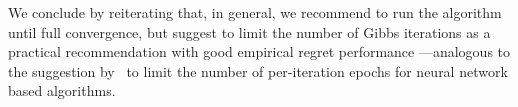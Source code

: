 We conclude by reiterating that, in general, we recommend to run the algorithm until full convergence, but suggest to limit the number of Gibbs iterations as a practical recommendation with good empirical regret performance ---analogous to the suggestion by~\citet{ip-Riquelme2018} to limit the number of per-iteration epochs for neural network based algorithms.
